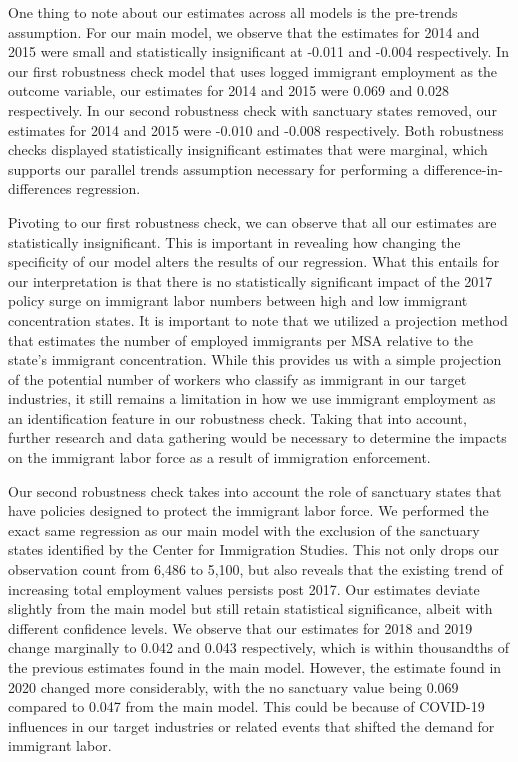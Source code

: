 \documentclass[12pt]{article}
\begin{document}
One thing to note about our estimates across all models is the pre-trends assumption. For our main model, we observe that the estimates for 2014 and 2015 were small and statistically insignificant at -0.011 and -0.004 respectively. In our first robustness check model that uses logged immigrant employment as the outcome variable, our estimates for 2014 and 2015 were 0.069 and 0.028 respectively. In our second robustness check with sanctuary states removed, our estimates for 2014 and 2015 were -0.010 and -0.008 respectively. Both robustness checks displayed statistically insignificant estimates that were marginal, which supports our parallel trends assumption necessary for performing a difference-in-differences regression.

Pivoting to our first robustness check, we can observe that all our estimates are statistically insignificant. This is important in revealing how changing the specificity of our model alters the results of our regression. What this entails for our interpretation is that there is no statistically significant impact of the 2017 policy surge on immigrant labor numbers between high and low immigrant concentration states. It is important to note that we utilized a projection method that estimates the number of employed immigrants per MSA relative to the state's immigrant concentration. While this provides us with a simple projection of the potential number of workers who classify as immigrant in our target industries, it still remains a limitation in how we use immigrant employment as an identification feature in our robustness check. Taking that into account, further research and data gathering would be necessary to determine the impacts on the immigrant labor force as a result of immigration enforcement.

Our second robustness check takes into account the role of sanctuary states that have policies designed to protect the immigrant labor force. We performed the exact same regression as our main model with the exclusion of the sanctuary states identified by the Center for Immigration Studies. This not only drops our observation count from 6,486 to 5,100, but also reveals that the existing trend of increasing total employment values persists post 2017. Our estimates deviate slightly from the main model but still retain statistical significance, albeit with different confidence levels. We observe that our estimates for 2018 and 2019 change marginally to 0.042 and 0.043 respectively, which is within thousandths of the previous estimates found in the main model. However, the estimate found in 2020 changed more considerably, with the no sanctuary value being 0.069 compared to 0.047 from the main model. This could be because of COVID-19 influences in our target industries or related events that shifted the demand for immigrant labor.
\end{document}
